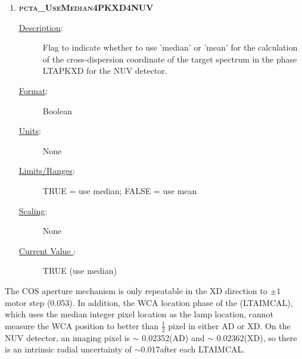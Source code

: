 \begin{enumerate}
\item{\textsc{\bf pcta\_UseMedian4PKXD4NUV}}
	\begin{description}
	\item[\underline{\rm Description}:]Flag to indicate whether to use 'median' or 'mean' for the calculation of the cross-dispersion coordinate of the target spectrum in the phase \textsc{LTAPKXD} for the NUV detector.
	\item[\underline{\rm Format}:]    Boolean
	\item[\underline{\rm Units}:]     None
	\item[\underline{\rm Limits/Ranges}:]  TRUE = use median;  FALSE = use mean
	\item[\underline{\rm Scaling}:]   None
	\item[\underline{\rm Current Value }:]   TRUE (use median)
\end{description}
\end{enumerate}
\normalsize

The COS aperture mechanism is only repeatable in the XD direction to $\pm 1$ motor step (0.053\arcsec). In addition, the WCA location
phase of the  (\textsc{LTAIMCAL}), which uses the median integer pixel location as the lamp location, cannot measure the WCA position to better than $\frac{1}{2}$ pixel in either AD or XD.
On the NUV detector, an imaging pixel is $\sim$ 0.02352\arcsec (AD) and $\sim$ 0.02362\arcsec (XD), so there is an intrinsic radial uncertainty of $\sim$0.017\arcsec after each \textsc{LTAIMCAL}.



